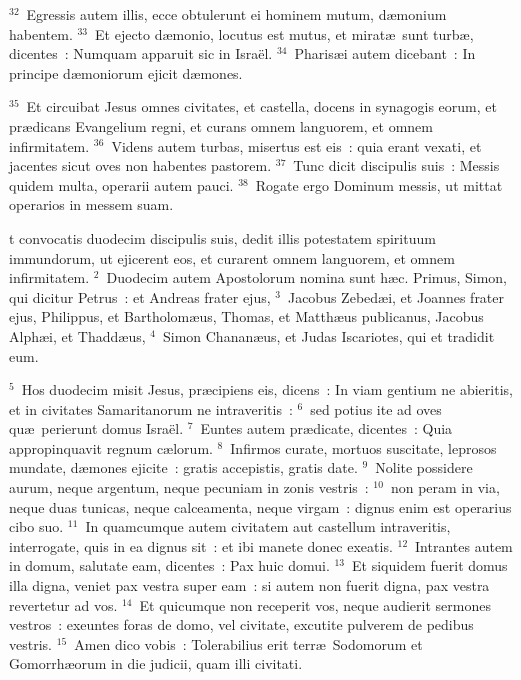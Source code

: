 ${}^{32}$~Egressis autem illis, ecce obtulerunt ei hominem mutum, d\ae monium habentem.
${}^{33}$~Et ejecto d\ae monio, locutus est mutus, et mirat\ae\ sunt turb\ae , dicentes~: Numquam apparuit sic in Isra\"el.
${}^{34}$~Pharis\ae i autem dicebant~: In principe d\ae moniorum ejicit d\ae mones.


${}^{35}$~Et circuibat Jesus omnes civitates, et castella, docens in synagogis eorum, et pr\ae dicans Evangelium regni, et curans omnem languorem, et omnem infirmitatem.
${}^{36}$~Videns autem turbas, misertus est eis~: quia erant vexati, et jacentes sicut oves non habentes pastorem.
${}^{37}$~Tunc dicit discipulis suis~: Messis quidem multa, operarii autem pauci.
${}^{38}$~Rogate ergo Dominum messis, ut mittat operarios in messem suam.

\bchapter
{}t convocatis duodecim discipulis suis, dedit illis potestatem spirituum immundorum, ut ejicerent eos, et curarent omnem languorem, et omnem infirmitatem.
${}^{2}$~Duodecim autem Apostolorum nomina sunt h\ae c. Primus, Simon, qui dicitur Petrus~: et Andreas frater ejus,
${}^{3}$~Jacobus Zebed\ae i, et Joannes frater ejus, Philippus, et Bartholom\ae us, Thomas, et Matth\ae us publicanus, Jacobus Alph\ae i, et Thadd\ae us,
${}^{4}$~Simon Chanan\ae us, et Judas Iscariotes, qui et tradidit eum.


${}^{5}$~Hos duodecim misit Jesus, pr\ae cipiens eis, dicens~: In viam gentium ne abieritis, et in civitates Samaritanorum ne intraveritis~:
${}^{6}$~sed potius ite ad oves qu\ae\ perierunt domus Isra\"el.
${}^{7}$~Euntes autem pr\ae dicate, dicentes~: Quia appropinquavit regnum c\ae lorum.
${}^{8}$~Infirmos curate, mortuos suscitate, leprosos mundate, d\ae mones ejicite~: gratis accepistis, gratis date.
${}^{9}$~Nolite possidere aurum, neque argentum, neque pecuniam in zonis vestris~:
${}^{10}$~non peram in via, neque duas tunicas, neque calceamenta, neque virgam~: dignus enim est operarius cibo suo.
${}^{11}$~In quamcumque autem civitatem aut castellum intraveritis, interrogate, quis in ea dignus sit~: et ibi manete donec exeatis.
${}^{12}$~Intrantes autem in domum, salutate eam, dicentes~: Pax huic domui.
${}^{13}$~Et siquidem fuerit domus illa digna, veniet pax vestra super eam~: si autem non fuerit digna, pax vestra revertetur ad vos.
${}^{14}$~Et quicumque non receperit vos, neque audierit sermones vestros~: exeuntes foras de domo, vel civitate, excutite pulverem de pedibus vestris.
${}^{15}$~Amen dico vobis~: Tolerabilius erit terr\ae\ Sodomorum et Gomorrh\ae orum in die judicii, quam illi civitati.


